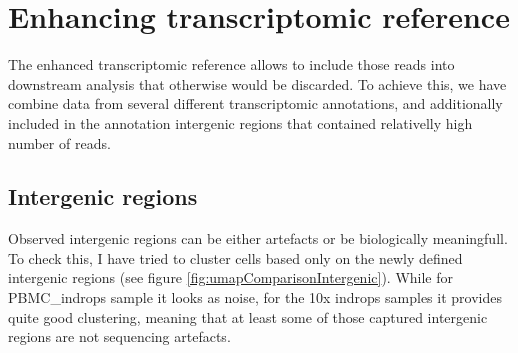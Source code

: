 \section{Enhancing transcriptomic reference}

The enhanced transcriptomic reference allows to include those reads into downstream analysis that otherwise would be discarded.
To achieve this, we have combine data from several different transcriptomic annotations,
and additionally included in the annotation intergenic regions that contained relativelly high number of reads.

\subsection{Intergenic regions}

Observed intergenic regions can be either artefacts or be biologically meaningfull.
To check this, I have tried to cluster cells based only on the newly defined intergenic regions (see figure \ref{fig:umapComparisonIntergenic}).
While for PBMC\_indrops sample it looks as noise, for the 10x indrops samples it provides quite good clustering,
meaning that at least some of those captured intergenic regions are not sequencing artefacts.

